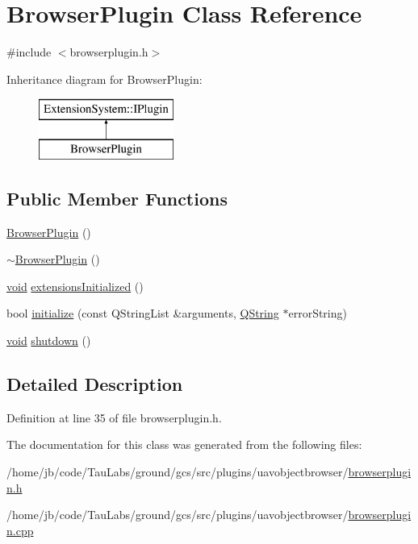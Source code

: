 \hypertarget{class_browser_plugin}{\section{\-Browser\-Plugin \-Class \-Reference}
\label{class_browser_plugin}
}


{\ttfamily \#include $<$browserplugin.\-h$>$}

\-Inheritance diagram for \-Browser\-Plugin\-:\begin{figure}[H]
\begin{center}
\leavevmode
\includegraphics[height=2.000000cm]{class_browser_plugin}
\end{center}
\end{figure}
\subsection*{\-Public \-Member \-Functions}
\begin{DoxyCompactItemize}
\item 
\hyperlink{group___u_a_v_object_browser_plugin_ga63db697e4bb11742d9d946ca7c08fb7a}{\-Browser\-Plugin} ()
\item 
\hyperlink{group___u_a_v_object_browser_plugin_ga35e9b6db09f29a19459f9012c2251980}{$\sim$\-Browser\-Plugin} ()
\item 
\hyperlink{group___u_a_v_objects_plugin_ga444cf2ff3f0ecbe028adce838d373f5c}{void} \hyperlink{group___u_a_v_object_browser_plugin_gabd7f5c6dac73c173cebd4e59dbc99182}{extensions\-Initialized} ()
\item 
bool \hyperlink{group___u_a_v_object_browser_plugin_gac452314c7c28ab0c1fb1bb935bed5d0d}{initialize} (const \-Q\-String\-List \&arguments, \hyperlink{group___u_a_v_objects_plugin_gab9d252f49c333c94a72f97ce3105a32d}{\-Q\-String} $\ast$error\-String)
\item 
\hyperlink{group___u_a_v_objects_plugin_ga444cf2ff3f0ecbe028adce838d373f5c}{void} \hyperlink{group___u_a_v_object_browser_plugin_ga8d7b6113315a8625ce56679504594fa3}{shutdown} ()
\end{DoxyCompactItemize}


\subsection{\-Detailed \-Description}


\-Definition at line 35 of file browserplugin.\-h.



\-The documentation for this class was generated from the following files\-:\begin{DoxyCompactItemize}
\item 
/home/jb/code/\-Tau\-Labs/ground/gcs/src/plugins/uavobjectbrowser/\hyperlink{browserplugin_8h}{browserplugin.\-h}\item 
/home/jb/code/\-Tau\-Labs/ground/gcs/src/plugins/uavobjectbrowser/\hyperlink{browserplugin_8cpp}{browserplugin.\-cpp}\end{DoxyCompactItemize}
